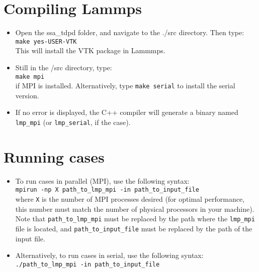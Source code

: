 \documentclass[a4paper,12pt,oneside]{report}
\begin{document}
\section{Compiling Lammps}
\begin{itemize}

\item Open the ssa\_tdpd folder, and navigate to the ./src directory. Then type: \\

  \texttt{make yes-USER-VTK}\\

This will install the VTK package in Lammmps.


\item Still in the /src directory, type:\\

  \texttt{make mpi}\\
  
if MPI is installed. Alternatively, type \texttt{make serial} to install the serial version.\\

  
\item If no error is displayed, the C++ compiler will generate a binary named \texttt{lmp\_mpi} (or \texttt{lmp\_serial}, if the case). 
  
\end{itemize}



\section{Running cases}

\begin{itemize}

\item To run cases in parallel (MPI), use the following syntax:\\
  
  \texttt{mpirun -np X path\_to\_lmp\_mpi -in path\_to\_input\_file}\\
  
where \texttt{X} is the number of MPI processes desired (for optimal performance, this number must match the number of physical processors in your machine).
Note that \texttt{path\_to\_lmp\_mpi} must be replaced by the path where the \texttt{lmp\_mpi} file is located, and \texttt{path\_to\_input\_file} must be replaced by the path of the input file.

\item Alternatively, to run cases in serial, use the following syntax:\\
  
  \texttt{./path\_to\_lmp\_mpi -in path\_to\_input\_file}\\
  
  
\end{itemize}
\end{document}

